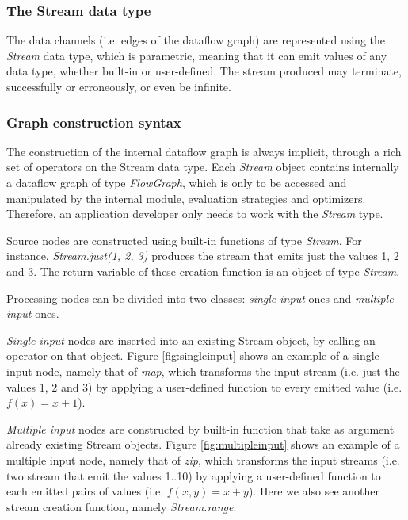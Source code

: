 \documentclass[sigplan,review,anonymous]{acmart}
\begin{document}
\subsubsection{The Stream data type}

The data channels (i.e. edges of the dataflow graph) are represented using the
\textit{Stream} data type, which is parametric, meaning that it can emit values
of any data type, whether built-in or user-defined. The stream produced may
terminate, successfully or erroneously, or even be infinite.

\subsubsection{Graph construction syntax}

The construction of the internal dataflow graph is always implicit, through a
rich set of operators on the Stream data type. Each \textit{Stream} object
contains internally a dataflow graph of type \textit{FlowGraph}, which is only
to be accessed and manipulated by the internal module, evaluation strategies and
optimizers. Therefore, an application developer only needs to work with the
\textit{Stream} type.

Source nodes are constructed using built-in functions of type \textit{Stream}.
For instance, \textit{Stream.just(1, 2, 3)} produces the stream that emits just
the values 1, 2 and 3. The return variable of these creation function is an
object of type \textit{Stream}.

Processing nodes can be divided into two classes: \textit{single input} ones and
\textit{multiple input} ones.

\textit{Single input} nodes are inserted into an existing Stream object, by
calling an operator on that object. Figure \ref{fig:singleinput} shows an
example of a single input node, namely that of \textit{map}, which transforms
the input stream (i.e. just the values 1, 2 and 3) by applying a user-defined
function to every emitted value (i.e. $f(x)=x+1$).


\textit{Multiple input} nodes are constructed by built-in function that take as
argument already existing Stream objects. Figure \ref{fig:multipleinput} shows
an example of a multiple input node, namely that of \textit{zip}, which
transforms the input streams (i.e. two stream that emit the values 1..10) by
applying a user-defined function to each emitted pairs of values (i.e.
$f(x,y)=x+y$). Here we also see another stream creation function, namely
\textit{Stream.range}.
\end{document}
